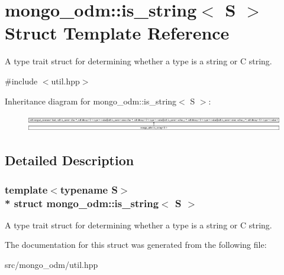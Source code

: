 \hypertarget{structmongo__odm_1_1is__string}{}\section{mongo\+\_\+odm\+:\+:is\+\_\+string$<$ S $>$ Struct Template Reference}
\label{structmongo__odm_1_1is__string}


A type trait struct for determining whether a type is a string or C string.  




{\ttfamily \#include $<$util.\+hpp$>$}

Inheritance diagram for mongo\+\_\+odm\+:\+:is\+\_\+string$<$ S $>$\+:\begin{figure}[H]
\begin{center}
\leavevmode
\includegraphics[height=0.748163cm]{structmongo__odm_1_1is__string}
\end{center}
\end{figure}


\subsection{Detailed Description}
\subsubsection*{template$<$typename S$>$\\*
struct mongo\+\_\+odm\+::is\+\_\+string$<$ S $>$}

A type trait struct for determining whether a type is a string or C string. 

The documentation for this struct was generated from the following file\+:\begin{DoxyCompactItemize}
\item 
src/mongo\+\_\+odm/util.\+hpp\end{DoxyCompactItemize}
